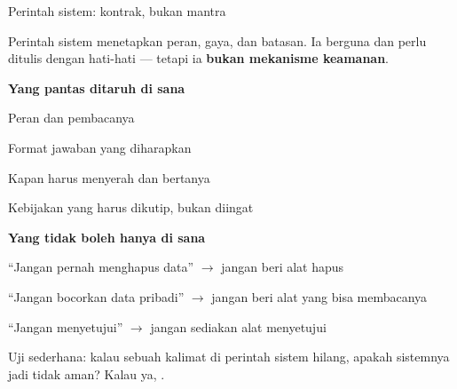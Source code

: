\documentclass[aspectratio=169,11pt,t]{beamer}
\begin{document}
\begin{frame}[shrink=25]{Perintah sistem: kontrak, bukan mantra}
{\fontsize{9.4}{12.6}\selectfont\color{fg2}Perintah sistem menetapkan peran, gaya, dan batasan. Ia berguna dan perlu ditulis dengan hati-hati --- tetapi ia \textbf{bukan mekanisme keamanan}.\par}\vskip 4pt
\begin{minipage}[t]{0.485\textwidth}
{\fontsize{9.4}{12.6}\selectfont\color{fg2}\textbf{Yang pantas ditaruh di sana}\par}\vskip 4pt
\begin{ibullets}
\item Peran dan pembacanya
\item Format jawaban yang diharapkan
\item Kapan harus menyerah dan bertanya
\item Kebijakan yang harus dikutip, bukan diingat
\end{ibullets}

\end{minipage}%
\hfill
\begin{minipage}[t]{0.485\textwidth}
{\fontsize{9.4}{12.6}\selectfont\color{fg2}\textbf{Yang tidak boleh hanya di sana}\par}\vskip 4pt
\begin{ibullets}
\item ``Jangan pernah menghapus data'' $\rightarrow$ jangan beri alat hapus
\item ``Jangan bocorkan data pribadi'' $\rightarrow$ jangan beri alat yang bisa membacanya
\item ``Jangan menyetujui'' $\rightarrow$ jangan sediakan alat menyetujui
\end{ibullets}

\end{minipage}%
\begin{iband}[signal]
Uji sederhana: kalau sebuah kalimat di perintah sistem hilang, apakah sistemnya jadi tidak aman? Kalau ya, .
\end{iband}
\end{frame}
\end{document}
